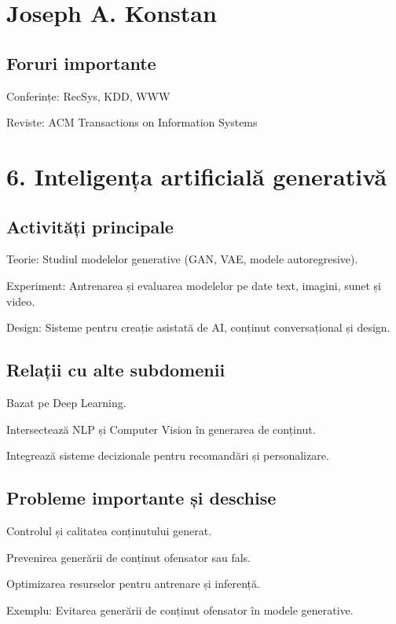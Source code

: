\documentclass[12pt]{article}
\begin{document}
\section*{Joseph A. Konstan}

\subsection*{Foruri importante}

Conferințe: RecSys, KDD, WWW

Reviste: ACM Transactions on Information Systems

\section{6. Inteligența artificială generativă}

\subsection*{Activități principale}

Teorie: Studiul modelelor generative (GAN, VAE, modele autoregresive).

Experiment: Antrenarea și evaluarea modelelor pe date text, imagini, sunet și video.

Design: Sisteme pentru creație asistată de AI, conținut conversațional și design.

\subsection*{Relații cu alte subdomenii}

Bazat pe Deep Learning.

Intersectează NLP și Computer Vision în generarea de conținut.

Integrează sisteme decizionale pentru recomandări și personalizare.

\subsection*{Probleme importante și deschise}

Controlul și calitatea conținutului generat.

Prevenirea generării de conținut ofensator sau fals.

Optimizarea resurselor pentru antrenare și inferență.

Exemplu: Evitarea generării de conținut ofensator în modele generative.
\end{document}

